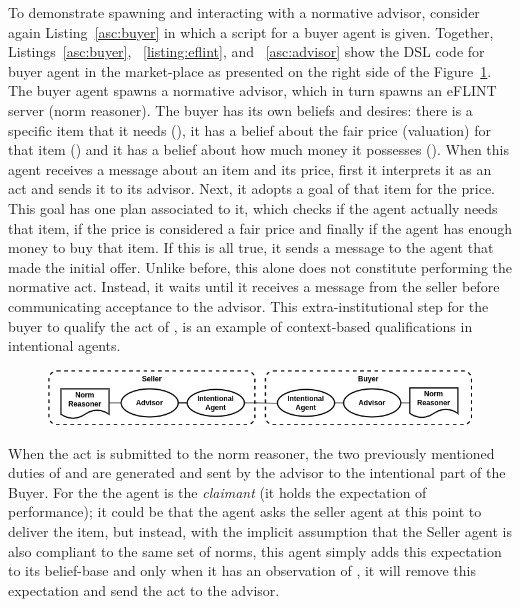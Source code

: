 To demonstrate spawning and interacting with a normative advisor, consider again Listing~\ref{asc:buyer} in which a script for a buyer agent is given.
%
Together, Listings~\ref{asc:buyer}, ~\ref{listing:eflint}, and ~\ref{asc:advisor} show the DSL code for buyer agent in the market-place as presented on the right side of the Figure~\ref{fig:non-gov}.
%
The buyer agent spawns a normative advisor, which in turn spawns an eFLINT server (norm reasoner). 
%
The buyer has its own beliefs and desires: there is a specific item that it needs (), it has a belief about the fair price (valuation) for that item () and it has a belief about how much money it possesses ().
%
When this agent receives a  message about an item and its price, first it interprets it as an  act and sends it to its advisor. Next, it adopts a goal of  that item for the price. This goal has one plan associated to it, which checks if the agent actually needs that item, if the price is considered a fair price and finally if the agent has enough money to buy that item. If this is all true, it sends a  message to the agent that made the initial offer. Unlike before, this alone does not constitute performing the normative  act. Instead, it waits until it receives a  message from the seller before communicating acceptance to the advisor. This extra-institutional step for the buyer to qualify the act of , is an example of context-based qualifications in intentional agents.

\begin{figure}[!tb]
  \centering
  \includegraphics[width=.8\textwidth]{ch4/ad-hoc.drawio.png}
  \label{fig:non-gov}
\end{figure}

When the  act is submitted to the norm reasoner, the two previously mentioned duties of  and  are generated and sent by the advisor to the intentional part of the Buyer. For the  the agent is the \textit{claimant} (it holds the expectation of performance); it could be that the agent asks the seller agent at this point to deliver the item, but instead, with the implicit assumption that the Seller agent is also compliant to the same set of norms, this agent simply adds this expectation to its belief-base and only when it has an observation of , it will remove this expectation and send the  act to the advisor. 

